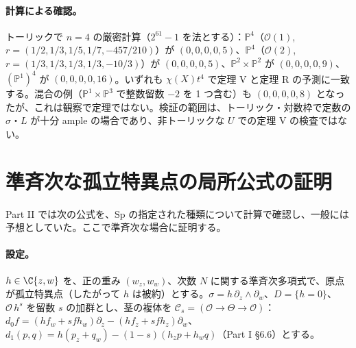 \paragraph{計算による確認\tV。}トーリックで $n=4$ の厳密計算（$2^{61}-1$ を法とする）：$\mathbb P^4$（$\mathcal O(1)$, $r=(1/2,1/3,1/5,1/7,-457/210)$）が $(0,0,0,0,5)$、$\mathbb P^4$（$\mathcal O(2)$, $r=(1/3,1/3,1/3,1/3,-10/3)$）が $(0,0,0,0,5)$、$\mathbb P^2\times\mathbb P^2$ が $(0,0,0,0,9)$、$(\mathbb P^1)^4$ が $(0,0,0,0,16)$。いずれも $\chi(X)t^4$ で定理 V と定理 R の予測に一致する。混合の例（$\mathbb P^1\times\mathbb P^3$ で整数留数 $-2$ を 1 つ含む）も $(0,0,0,0,8)$ となったが、これは観察で定理ではない。検証の範囲は、トーリック・対数枠で定数の $\sigma$・$L$ が十分 ample の場合であり、非トーリックな $U$ での定理 V の検査ではない。

\section{準斉次な孤立特異点の局所公式の証明}\label{sec:local}
Part II では次の公式を、$\mathrm{Sp}$ の指定された種類について計算で確認し、一般には予想としていた。ここで準斉次な場合に証明する。

\paragraph{設定。}$h\in\C\{z,w\}$ を、正の重み $(w_z,w_w)$、次数 $N$ に関する準斉次多項式で、原点が孤立特異点（したがって $h$ は被約）とする。$\sigma=h\,\partial_z\wedge\partial_w$、$D=\{h=0\}$、$\mathcal O\,h^s$ を留数 $s$ の加群とし、茎の複体を $\mathcal C_s=(\mathcal O\to\Theta\to\mathcal O)$：$d_0f=(hf_w+sfh_w)\partial_z-(hf_z+sfh_z)\partial_w$、$d_1(p,q)=h(p_z+q_w)-(1-s)(h_zp+h_wq)$（Part I \S6.6）とする。

